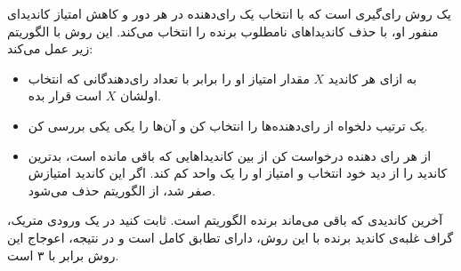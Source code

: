 یک روش رای‌گیری است که با انتخاب یک رای‌دهنده در هر دور و کاهش امتیاز کاندیدای منفور او، با حذف کاندیداهای نامطلوب برنده را انتخاب می‌کند. این روش با الگوریتم زیر عمل می‌کند:
\begin{itemize}
    \item
    به ازای هر کاندید $X$ مقدار امتیاز او را برابر با تعداد رای‌دهندگانی که انتخاب اولشان $X$ است قرار بده.

    \item
    یک ترتیب دلخواه از رای‌دهنده‌ها را انتخاب کن و آن‌ها را یکی یکی بررسی کن.

    \item
    از هر رای دهنده درخواست کن از بین کاندیداهایی که باقی مانده است، بدترین کاندید را از دید خود انتخاب و امتیاز او را یک واحد کم کند. اگر این کاندید امتیازش صفر شد، از الگوریتم حذف می‌شود.
\end{itemize}
آخرین کاندیدی که باقی می‌ماند برنده الگوریتم است. ثابت کنید در یک ورودی متریک، گراف غلبه‌ی کاندید برنده با این روش، دارای تطابق کامل است و در نتیجه، اعوجاج این روش برابر با ۳ است.
